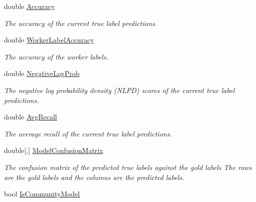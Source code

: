 \begin{DoxyCompactItemize}
double \hyperlink{class_crowdsourcing_models_1_1_results_a0ae7118c643ec96ed7cf4f05db48c562}{Accuracy}
\begin{DoxyCompactList}\small\item\em The accuracy of the current true label predictions. \end{DoxyCompactList}\item 
double \hyperlink{class_crowdsourcing_models_1_1_results_aab75338f84a6d1110365817b68691d4f}{Worker\+Label\+Accuracy}
\begin{DoxyCompactList}\small\item\em The accuracy of the worker labels. \end{DoxyCompactList}\item 
double \hyperlink{class_crowdsourcing_models_1_1_results_a61808b2f35c5c4f739ed37eef609bfef}{Negative\+Log\+Prob}
\begin{DoxyCompactList}\small\item\em The negative log probability density (N\+L\+P\+D) scores of the current true label predictions. \end{DoxyCompactList}\item 
double \hyperlink{class_crowdsourcing_models_1_1_results_a578be0205d443ac94124b8f7b89caa74}{Avg\+Recall}
\begin{DoxyCompactList}\small\item\em The average recall of the current true label predictions. \end{DoxyCompactList}\item 
double\mbox{[},\mbox{]} \hyperlink{class_crowdsourcing_models_1_1_results_a3743219650ac6c051e146aa6c628da13}{Model\+Confusion\+Matrix}
\begin{DoxyCompactList}\small\item\em The confusion matrix of the predicted true labels against the gold labels The rows are the gold labels and the columns are the predicted labels. \end{DoxyCompactList}\item 
bool \hyperlink{class_crowdsourcing_models_1_1_results_a87952670327f4e18a4183dab7238c3d4}{Is\+Community\+Model}

\end{DoxyCompactItemize}
